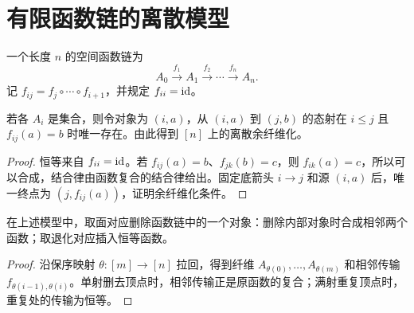 \section{有限函数链的离散模型}
\begin{definition}[函数链]
一个长度 $n$ 的空间函数链为
\[
A_0\xrightarrow{f_1}A_1\xrightarrow{f_2}\cdots
\xrightarrow{f_n}A_n.
\]
记 $f_{ij}=f_j\circ\cdots\circ f_{i+1}$，并规定 $f_{ii}=\operatorname{id}$。
\end{definition}
\begin{proposition}[集合链的元素范畴]
若各 $A_i$ 是集合，则令对象为 $(i,a)$，从 $(i,a)$ 到 $(j,b)$ 的态射在 $i\le j$ 且 $f_{ij}(a)=b$ 时唯一存在。由此得到 $[n]$ 上的离散余纤维化。
\end{proposition}
\begin{proof}
恒等来自 $f_{ii}=\operatorname{id}$。若 $f_{ij}(a)=b$、$f_{jk}(b)=c$，则 $f_{ik}(a)=c$，所以可以合成，结合律由函数复合的结合律给出。固定底箭头 $i\to j$ 和源 $(i,a)$ 后，唯一终点为 $(j,f_{ij}(a))$，证明余纤维化条件。
\end{proof}
\begin{proposition}
在上述模型中，取面对应删除函数链中的一个对象：删除内部对象时合成相邻两个函数；取退化对应插入恒等函数。
\end{proposition}
\begin{proof}
沿保序映射 $\theta:[m]\to[n]$ 拉回，得到纤维 $A_{\theta(0)},\ldots,A_{\theta(m)}$ 和相邻传输 $f_{\theta(i-1),\theta(i)}$。单射删去顶点时，相邻传输正是原函数的复合；满射重复顶点时，重复处的传输为恒等。
\end{proof}

